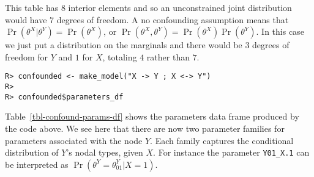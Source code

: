 \documentclass[
  11pt,
  article]{jss}
\begin{document}
This table has 8 interior elements and so an unconstrained joint
distribution would have \(7\) degrees of freedom. A no confounding
assumption means that \(\Pr(\theta^X | \theta^Y) = \Pr(\theta^X)\), or
\(\Pr(\theta^X, \theta^Y) = \Pr(\theta^X)\Pr(\theta^Y)\). In this case
we just put a distribution on the marginals and there would be \(3\)
degrees of freedom for \(Y\) and \(1\) for \(X\), totaling \(4\) rather
than \(7\).

\begin{verbatim}
R> confounded <- make_model("X -> Y ; X <-> Y")
R> 
R> confounded$parameters_df
\end{verbatim}

\hypertarget{tbl-confound-params-df}{}
\begin{table}
\caption{\label{tbl-confound-params-df}Parameters Data Frame for Model with Confounding. }\tabularnewline

\centering
{}
\end{table}

Table~\ref{tbl-confound-params-df} shows the parameters data frame
produced by the code above. We see here that there are now two parameter
families for parameters associated with the node \(Y\). Each family
captures the conditional distribution of \(Y\)'s nodal types, given
\(X\). For instance the parameter \texttt{Y01\_X.1} can be interpreted
as \(\Pr(\theta^Y = \theta^Y_{01} | X=1)\).
\end{document}
